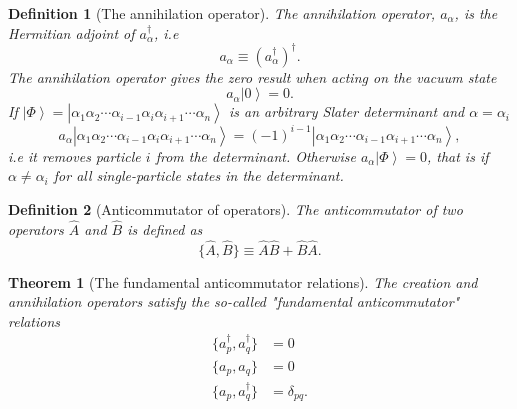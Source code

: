 \documentclass[a4paper,10pt]{report}
\newcommand{\ket}[1]{\left| #1 \right\rangle} \newcommand{\element}[3]
\theoremstyle{definition}
\newtheorem{definition}{Definition}
\newtheorem{theorem}{Theorem}
\begin{document}
\begin{definition}[The annihilation operator]
The annihilation operator, $a_\alpha$, is the Hermitian adjoint of $a_\alpha^\dagger$, i.e 
\begin{equation}
a_\alpha \equiv (a_\alpha^\dagger)^\dagger. 
\end{equation}
The annihilation operator gives the zero result when acting on the vacuum state 
\begin{equation}
 a_\alpha \ket{0} = 0.
\end{equation}
If $\ket{\Phi} = \ket{\alpha_1 \alpha_2 \cdots \alpha_{i-1} \alpha_{i} \alpha_{i+1} \cdots \alpha_n}$ is an 
arbitrary Slater determinant and $\alpha = \alpha_i$
\begin{equation}
 a_\alpha \ket{\alpha_1 \alpha_2 \cdots \alpha_{i-1} \alpha_{i} \alpha_{i+1} \cdots \alpha_n} = (-1)^{i-1}\ket{\alpha_1 \alpha_2 \cdots \alpha_{i-1}  \alpha_{i+1} \cdots \alpha_n},
\end{equation}
i.e it removes particle $i$ from the determinant. Otherwise $a_\alpha \ket{\Phi} = 0$, that is if 
$\alpha \neq \alpha_i$ for all single-particle states in the determinant.
\end{definition}

\begin{definition}[Anticommutator of operators]
The anticommutator of two operators $\hat{A}$ and $\hat{B}$ is defined as
 \begin{equation}
 \{\hat{A},\hat{B}\} \equiv \hat{A}\hat{B}+\hat{B}\hat{A}.                      
\end{equation}
\end{definition}
\begin{theorem}[The fundamental anticommutator relations]
The creation and annihilation operators satisfy the so-called "fundamental anticommutator" relations
\begin{align}
 \{a_p^\dagger,a_q^\dagger \} &= 0\\
 \{a_p,a_q \} &= 0\\
 \{a_p,a_q^\dagger \} &= \delta_{pq}.\\
\end{align}
\end{theorem}
\end{document}

